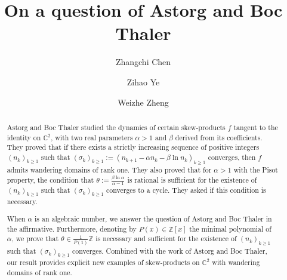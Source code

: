 \documentclass[12pt,centertags,oneside]{amsart}
\theoremstyle{definition}
\newcommand{\CC}{\mathbb{C}}
\begin{document}
\title{On a question of Astorg and Boc Thaler}

\author{Zhangchi Chen} 
\address[Zhangchi Chen]{School of Mathematical Sciences, Key Laboratory of MEA (Ministry of Education) and Shanghai Key Laboratory of PMMP, East China Normal University, Shanghai 200241, China}

\author{Zihao Ye}
\address[Zihao Ye]{School of Mathematical Sciences, East China Normal University, Shanghai 200241, China}

\author{Weizhe Zheng}
\address[Weizhe Zheng]{Morningside Center of Mathematics, Academy of Mathematics and Systems 
Science, Chinese Academy of Sciences, Beijing 100190, China; University of 
Chinese Academy of Sciences, Beijing 100049, China}  



\begin{abstract}
Astorg and Boc Thaler studied the dynamics of certain skew-products $f$ 
tangent to the identity on $\CC^2$, with two real parameters $\alpha>1$ and 
$\beta$ derived from its coefficients. They proved that if there exists a 
strictly increasing sequence of positive integers $(n_k)_{k\geqslant 1}$ 
such that $(\sigma_k)_{k\geqslant 1}:=(n_{k+1}-\alpha n_k-\beta\ln 
n_k)_{k\geqslant 1}$ converges, then  $f$ admits wandering domains of rank 
one. They also proved that for $\alpha>1$ with the Pisot property, the 
condition that $\theta:=\frac{\beta\ln\alpha}{\alpha-1}$ is rational is 
sufficient for the existence of $(n_k)_{k\geqslant 1}$ such that 
$(\sigma_k)_{k\geqslant 1}$ converges to a cycle. They asked if this 
condition is necessary. 

When $\alpha$ is an algebraic number, we answer the question of Astorg and 
Boc Thaler in the affirmative. Furthermore, denoting by 
$P(x)\in\mathbb{Z}[x]$ the minimal polynomial of~$\alpha$, we prove that 
$\theta\in\frac{1}{P(1)}\mathbb{Z}$ is necessary and sufficient for the 
existence of $(n_k)_{k\geqslant 1}$ such that $(\sigma_k)_{k\geqslant 1}$ 
converges. Combined with the work of Astorg and Boc Thaler, our result 
provides explicit new examples of skew-products on $\mathbb{C}^2$ with 
wandering domains of rank one.\end{abstract} \maketitle 
\end{document}
